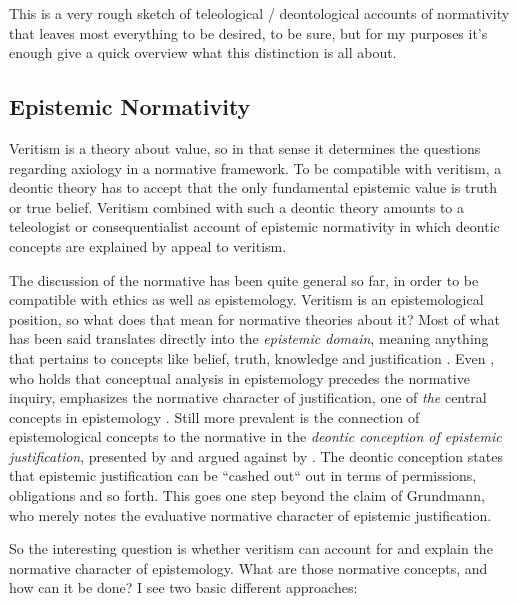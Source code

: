 \documentclass[12pt,numbers=noenddot]{scrartcl}
\begin{document}
This is a very rough sketch of teleological / deontological accounts of normativity that leaves most everything to be desired, to be sure, but for my purposes it's enough give a quick overview what this distinction is all about.

\subsection{Epistemic Normativity} \label{subsec: epistemic}

Veritism is a theory about value, so in that sense it determines the questions regarding axiology in a normative framework. To be compatible with veritism, a deontic theory has to accept that the only fundamental epistemic value is truth or true belief. Veritism combined with such a deontic theory amounts to a teleologist or consequentialist account of epistemic normativity in which deontic concepts are explained by appeal to veritism.

The discussion of the normative has been quite general so far, in order to be compatible with ethics as well as epistemology. Veritism is an epistemological position, so what does that mean for normative theories about it? Most of what has been said translates directly into the \emph{epistemic domain}, meaning anything that pertains to concepts like belief, truth, knowledge and justification \autocite{David2001-DAVTAT-7}. Even \textcite[7]{grundmann2008}, who holds that conceptual analysis in epistemology precedes the normative inquiry, emphasizes the normative character of justification, one of \emph{the} central concepts in epistemology \autocite[226]{grundmann2008}. Still more prevalent is the connection of epistemological concepts to the normative in the \emph{deontic conception of epistemic justification}, presented by \textcite{Steup1988-STETDC} and argued against by \textcite{Alston1988-ALSTDC}. The deontic conception states that epistemic justification can be “cashed out“ out in terms of permissions, obligations and so forth. This goes one step beyond the claim of Grundmann, who merely notes the evaluative normative character of epistemic justification.

So the interesting question is whether veritism can account for and explain the normative character of epistemology. What are those normative concepts, and how can it be done? I see two basic different approaches:
\end{document}
